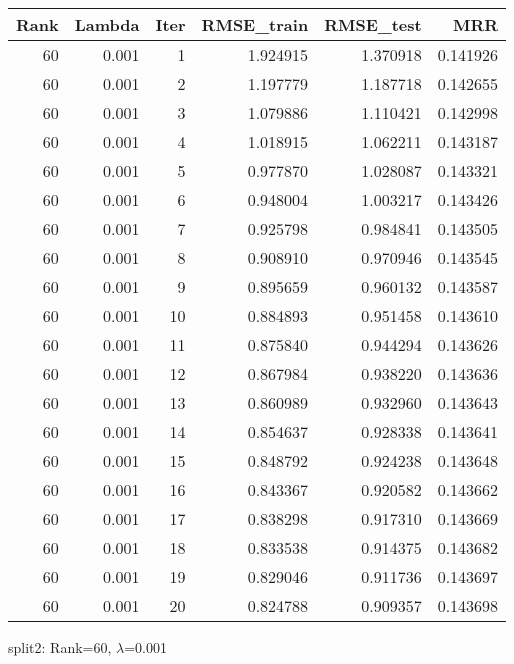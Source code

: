\begin{tabular}{rrrrrr}
\toprule
 Rank &  Lambda &  Iter &  RMSE\_train &  RMSE\_test &       MRR \\
\midrule
   60 &   0.001 &     1 &    1.924915 &   1.370918 &  0.141926 \\
   60 &   0.001 &     2 &    1.197779 &   1.187718 &  0.142655 \\
   60 &   0.001 &     3 &    1.079886 &   1.110421 &  0.142998 \\
   60 &   0.001 &     4 &    1.018915 &   1.062211 &  0.143187 \\
   60 &   0.001 &     5 &    0.977870 &   1.028087 &  0.143321 \\
   60 &   0.001 &     6 &    0.948004 &   1.003217 &  0.143426 \\
   60 &   0.001 &     7 &    0.925798 &   0.984841 &  0.143505 \\
   60 &   0.001 &     8 &    0.908910 &   0.970946 &  0.143545 \\
   60 &   0.001 &     9 &    0.895659 &   0.960132 &  0.143587 \\
   60 &   0.001 &    10 &    0.884893 &   0.951458 &  0.143610 \\
   60 &   0.001 &    11 &    0.875840 &   0.944294 &  0.143626 \\
   60 &   0.001 &    12 &    0.867984 &   0.938220 &  0.143636 \\
   60 &   0.001 &    13 &    0.860989 &   0.932960 &  0.143643 \\
   60 &   0.001 &    14 &    0.854637 &   0.928338 &  0.143641 \\
   60 &   0.001 &    15 &    0.848792 &   0.924238 &  0.143648 \\
   60 &   0.001 &    16 &    0.843367 &   0.920582 &  0.143662 \\
   60 &   0.001 &    17 &    0.838298 &   0.917310 &  0.143669 \\
   60 &   0.001 &    18 &    0.833538 &   0.914375 &  0.143682 \\
   60 &   0.001 &    19 &    0.829046 &   0.911736 &  0.143697 \\
   60 &   0.001 &    20 &    0.824788 &   0.909357 &  0.143698 \\
\bottomrule
\end{tabular}

\caption{split2: Rank=60, $\lambda$=0.001}
